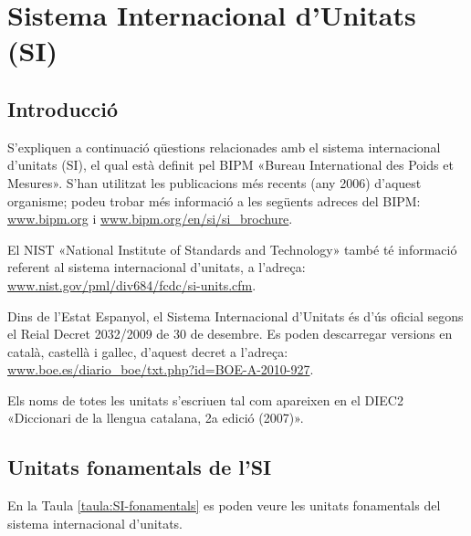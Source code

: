 \chapter{Sistema Internacional d'Unitats (SI)}\label{sec:SI}

\section{Introducció}
S'expliquen a continuació qüestions relacionades amb el sistema
internacional d'unitats (SI), el qual està definit pel BIPM «Bureau
International des Poids et Mesures». S'han utilitzat les publicacions més recents (any 2006) d'aquest organisme; podeu trobar més informació a les següents adreces del BIPM: \href{http://www.bipm.org/}{www.bipm.org} i
\href{http://www.bipm.org/en/si/si_brochure/}{www.bipm.org/en/si/si\_brochure}.

El NIST «National Institute of Standards and Technology» també té informació referent al sistema
internacional d'unitats, a l'adreça: \href{http://www.nist.gov/pml/div684/fcdc/si-units.cfm}
{www.nist.gov/pml/div684/fcdc/si-units.cfm}.

Dins de l'Estat Espanyol, el Sistema Internacional d'Unitats és d'ús oficial segons el Reial Decret 2032/2009 de 30 de desembre. Es poden descarregar versions en català, castellà i gallec, d'aquest decret a l'adreça: \href{http://www.boe.es/diario_boe/txt.php?id=BOE-A-2010-927}
{www.boe.es/diario\_boe/txt.php?id=BOE-A-2010-927}.

Els noms de totes les unitats s'escriuen tal com apareixen en el DIEC2 «Diccionari de la llengua catalana, 2a edició (2007)».

\section{Unitats fonamentals de l'SI}

En la Taula \vref{taula:SI-fonamentals} es poden veure les unitats
fonamentals del sistema internacional d'unitats.

